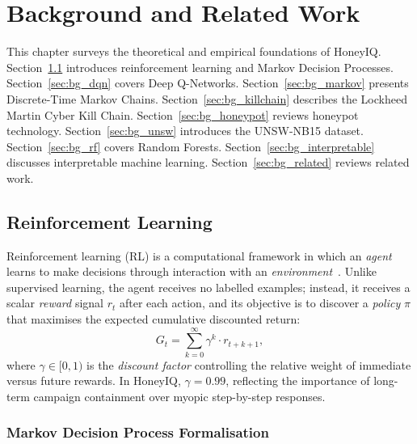 \chapter{Background and Related Work}
\label{ch:background}

This chapter surveys the theoretical and empirical foundations of HoneyIQ.
Section~\ref{sec:bg_rl} introduces reinforcement learning and Markov Decision
Processes.
Section~\ref{sec:bg_dqn} covers Deep Q-Networks.
Section~\ref{sec:bg_markov} presents Discrete-Time Markov Chains.
Section~\ref{sec:bg_killchain} describes the Lockheed Martin Cyber Kill Chain.
Section~\ref{sec:bg_honeypot} reviews honeypot technology.
Section~\ref{sec:bg_unsw} introduces the UNSW-NB15 dataset.
Section~\ref{sec:bg_rf} covers Random Forests.
Section~\ref{sec:bg_interpretable} discusses interpretable machine learning.
Section~\ref{sec:bg_related} reviews related work.

\section{Reinforcement Learning}
\label{sec:bg_rl}

Reinforcement learning (RL) is a computational framework in which an
\emph{agent} learns to make decisions through interaction with an
\emph{environment}~\citep{sutton2018reinforcement}.
Unlike supervised learning, the agent receives no labelled examples; instead,
it receives a scalar \emph{reward} signal $r_t$ after each action, and its
objective is to discover a \emph{policy} $\pi$ that maximises the expected
cumulative discounted return:
%
\begin{equation}
  G_t = \sum_{k=0}^{\infty} \gamma^k \cdot r_{t+k+1},
  \label{eq:return}
\end{equation}
%
where $\gamma \in [0, 1)$ is the \emph{discount factor} controlling the
relative weight of immediate versus future rewards.
In HoneyIQ, $\gamma = 0.99$, reflecting the importance of long-term campaign
containment over myopic step-by-step responses.

\subsection{Markov Decision Process Formalisation}
\label{sec:mdp}

